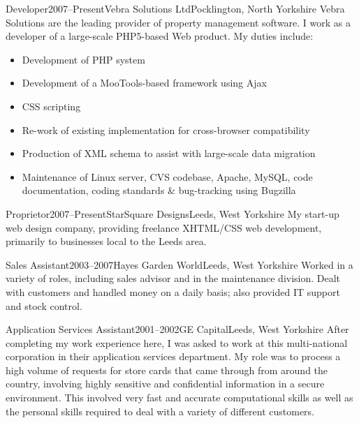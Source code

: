 \documentclass{cv}
\begin{document}
\begin{experience}{Developer}{2007--Present}{Vebra Solutions Ltd}{Pocklington, North Yorkshire}
Vebra Solutions are the leading provider of property management software. I work as a developer of a large-scale PHP5-based Web product. My duties include:

\begin{itemize}
\item Development of PHP system
\item Development of a MooTools-based framework using Ajax
\item CSS scripting
\item Re-work of existing implementation for cross-browser compatibility
\item Production of XML schema to assist with large-scale data migration
\item Maintenance of Linux server, CVS codebase, Apache, MySQL, code documentation, coding standards \& bug-tracking using Bugzilla
\end{itemize}
\end{experience}

\begin{experience}{Proprietor}{2007--Present}{StarSquare Designs}{Leeds, West Yorkshire}
My start-up web design company, providing freelance XHTML/CSS web development, primarily to businesses local to the Leeds area.
\end{experience}

\begin{experience}{Sales Assistant}{2003--2007}{Hayes Garden World}{Leeds, West Yorkshire}
Worked in a variety of roles, including sales advisor and in the maintenance division. Dealt with customers and handled money on a daily basis; also provided IT support and stock control.
\end{experience}

\begin{experience}{Application Services Assistant}{2001--2002}{GE Capital}{Leeds, West Yorkshire}
After completing my work experience here, I was asked to work at this multi-national corporation in their application services department. My role was to process a high volume of requests for store cards that came through from around the country, involving highly sensitive and confidential information in a secure environment. This involved very fast and accurate computational skills as well as the personal skills required to deal with a variety of different customers.
\end{experience}
\end{document}
